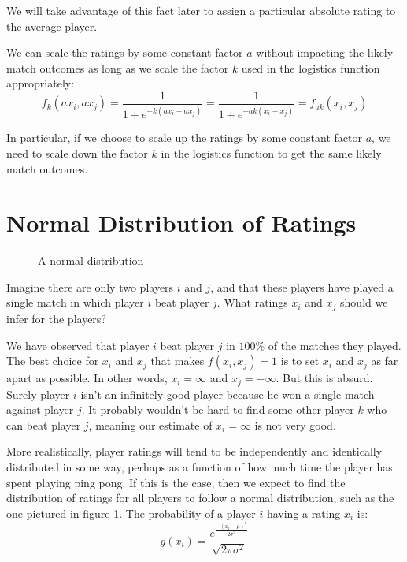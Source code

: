 \documentclass{article}
\begin{document}
We will take advantage of this fact later to assign a particular absolute
rating to the average player.

We can scale the ratings by some constant factor $a$ without impacting the
likely match outcomes as long as we scale the factor $k$ used in the
logistics function appropriately:
\begin{equation}
  f_k(a x_i, a x_j) =
  \frac{1}{1 + e^{-k(a x_i - a x_j)}} =
  \frac{1}{1 + e^{-ak(x_i - x_j)}} = f_{ak}(x_i, x_j)
\end{equation}

In particular, if we choose to scale up the ratings by some constant factor
$a$, we need to scale down the factor $k$ in the logistics function to get the
same likely match outcomes.

\section{Normal Distribution of Ratings}
\begin{figure}
  \caption{A normal distribution}
  \label{fig:normal}
 \end{figure}
Imagine there are only two players $i$ and $j$, and that these players have
played a single match in which player $i$ beat player $j$. What ratings $x_i$
and $x_j$ should we infer for the players?

We have observed that player $i$ beat player $j$ in $100\%$ of the matches
they played. The best choice for $x_i$ and $x_j$ that makes $f(x_i, x_j) = 1$
is to set $x_i$ and $x_j$ as far apart as possible. In other words,
$x_i = \infty$ and $x_j = -\infty$. But this is absurd. Surely player $i$
isn't an infinitely good player because he won a single match against player
$j$. It probably wouldn't be hard to find some other player $k$ who can beat
player $j$, meaning our estimate of $x_i = \infty$ is not very good.

More realistically, player ratings will tend to be independently and
identically distributed in some way, perhaps as a function of how much time
the player has spent playing ping pong. If this is the case, then we expect to
find the distribution of ratings for all players to follow a normal
distribution, such as the one pictured in figure \ref{fig:normal}. The
probability of a player $i$ having a rating $x_i$ is:
\begin{equation}
  g(x_i) = \frac{e^{\frac{-(x_i - \mu)^2}{2 \sigma^2}}}{\sqrt{2\pi\sigma^2}}
\end{equation}
\end{document}
